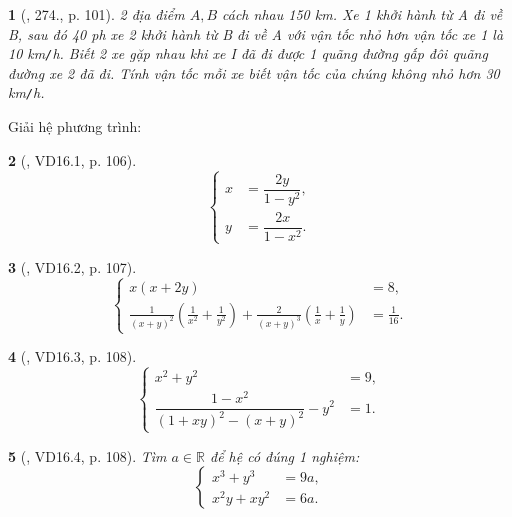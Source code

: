 \documentclass{article}
\newtheorem{baitoan}{}
\begin{document}
\begin{baitoan}[\cite{Tuyen_Toan_9_old}, 274., p. 101]
	2 địa điểm $A,B$ cách nhau {\rm150 km}. Xe 1 khởi hành từ A đi về B, sau đó {\rm40 ph} xe 2 khởi hành từ B đi về A với vận tốc nhỏ hơn vận tốc xe 1 là {\rm10 km{\tt/}h}. Biết 2 xe gặp nhau khi xe I đã đi được 1 quãng đường gấp đôi quãng đường xe 2 đã đi. Tính vận tốc mỗi xe biết vận tốc của chúng không nhỏ hơn {\rm30 km{\tt/}h}.
\end{baitoan}
Giải hệ phương trình:

\begin{baitoan}[\cite{TLCT_THCS_Toan_9_dai_so}, VD16.1, p. 106]
	\begin{equation*}
		\left\{\begin{split}
			x &= \dfrac{2y}{1 - y^2},\\
			y &= \dfrac{2x}{1 - x^2}.
		\end{split}\right.
	\end{equation*}
\end{baitoan}

\begin{baitoan}[\cite{TLCT_THCS_Toan_9_dai_so}, VD16.2, p. 107]
	\begin{equation*}
		\left\{\begin{split}
			x(x + 2y) &= 8,\\
			\frac{1}{(x + y)^2}\left(\frac{1}{x^2} + \frac{1}{y^2}\right) + \frac{2}{(x + y)^3}\left(\frac{1}{x} + \frac{1}{y}\right) &= \frac{1}{16}.
		\end{split}\right.
	\end{equation*}
\end{baitoan}

\begin{baitoan}[\cite{TLCT_THCS_Toan_9_dai_so}, VD16.3, p. 108]
	\begin{equation*}
		\left\{\begin{split}
			x^2 + y^2 &= 9,\\
			\dfrac{1 - x^2}{(1 + xy)^2 - (x + y)^2} - y^2 &= 1.
		\end{split}\right.
	\end{equation*}
\end{baitoan}

\begin{baitoan}[\cite{TLCT_THCS_Toan_9_dai_so}, VD16.4, p. 108]
	Tìm $a\in\mathbb{R}$ để hệ có đúng 1 nghiệm:
	\begin{equation*}
		\left\{\begin{split}
			x^3 + y^3 &= 9a,\\
			x^2y + xy^2 &= 6a.
		\end{split}\right.
	\end{equation*}
\end{baitoan}
\end{document}
